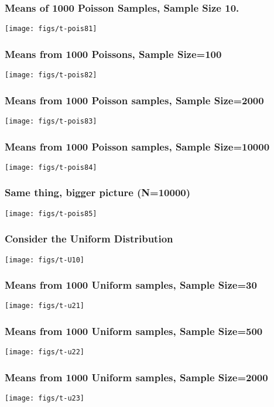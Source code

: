 \documentclass[10pt,english]{beamer}
\begin{document}
\begin{frame}
 \frametitle{Means of 1000 Poisson Samples, Sample Size 10\label{fig:PoissonMeans}.}

 \texttt{[image: figs/t-pois81]}

\end{frame}

\begin{frame}
  \frametitle{Means from 1000 Poissons, Sample Size=100}
 \texttt{[image: figs/t-pois82]}
 
\end{frame}

\begin{frame}
  \frametitle{Means from 1000 Poisson samples, Sample Size=2000}

 \texttt{[image: figs/t-pois83]}

\end{frame}

\begin{frame}
  \frametitle{Means from 1000 Poisson samples, Sample Size=10000}

 \texttt{[image: figs/t-pois84]}
\end{frame}



\begin{frame}
  \frametitle{Same thing, bigger picture (N=10000)}

 \texttt{[image: figs/t-pois85]}
\end{frame}


\begin{frame}
 \frametitle{Consider the Uniform Distribution}

\texttt{[image: figs/t-U10]}
\end{frame}


\begin{frame}
  \frametitle{Means from 1000 Uniform samples, Sample Size=30}

 \texttt{[image: figs/t-u21]}
\end{frame}


\begin{frame}
  \frametitle{Means from 1000 Uniform samples, Sample Size=500}

 \texttt{[image: figs/t-u22]}
\end{frame}


\begin{frame}
  \frametitle{Means from 1000 Uniform samples, Sample Size=2000}

 \texttt{[image: figs/t-u23]}
\end{frame}
\end{document}
